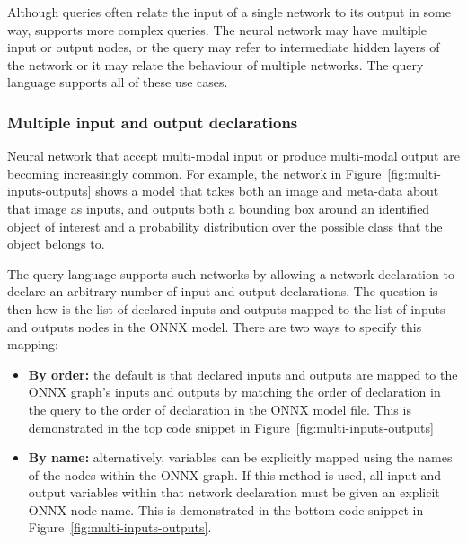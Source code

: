 Although queries often relate the input of a single network to its output in some way, \vnnlib{} supports more complex queries. The neural network may have multiple input or output nodes, or the query may refer to intermediate hidden layers of the network or it may relate the behaviour of multiple networks. The query language supports all of these use cases.

\subsubsection{Multiple input and output declarations}

Neural network that accept multi-modal input or produce multi-modal output are becoming increasingly common. 
For example, the network in Figure~\ref{fig:multi-inputs-outputs} shows a model that takes both an image and meta-data about that image as inputs, and outputs both a bounding box around an identified object of interest and a probability distribution over the possible class that the object belongs to. 

The query language supports such networks by allowing a network declaration to declare an arbitrary number of input and output declarations. The question is then how is the list of declared inputs and outputs mapped to the list of inputs and outputs nodes in the ONNX model. There are two ways to specify this mapping: 
\begin{itemize}
    \item \textbf{By order:} the default is that declared inputs and outputs are mapped to the ONNX graph's inputs and outputs by matching the order of declaration in the query to the order of declaration in the ONNX model file. This is demonstrated in the top code snippet in Figure~\ref{fig:multi-inputs-outputs}
    \item \textbf{By name:} alternatively, variables can be explicitly mapped using the names of the nodes within the ONNX graph. If this method is used, all input and output variables within that network declaration must be given an explicit ONNX node name. This is demonstrated in the bottom code snippet in Figure~\ref{fig:multi-inputs-outputs}.
\end{itemize}

